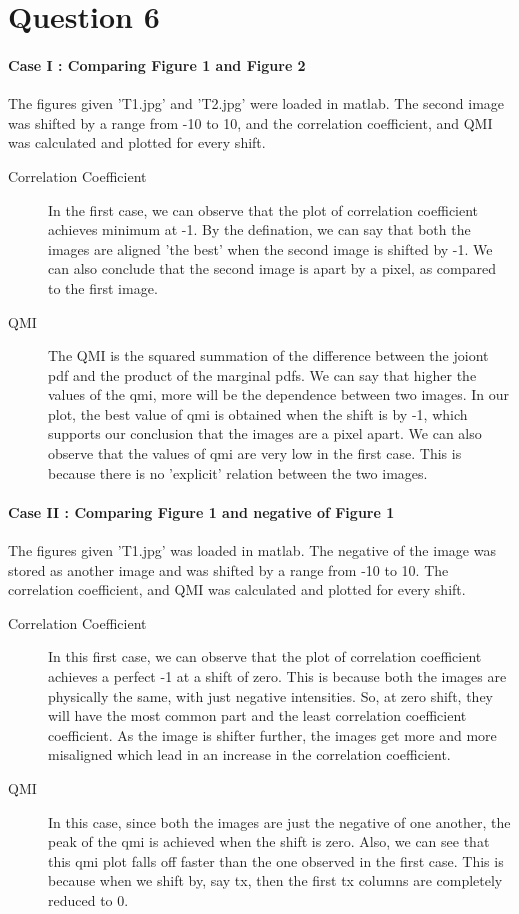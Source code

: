 \documentclass[12pt]{article}
\begin{document}
\newpage
\section{Question 6}
\paragraph{Case I : Comparing Figure 1 and Figure 2\newline}
The figures given 'T1.jpg' and 'T2.jpg' were loaded in matlab. The second image was shifted by a range from -10 to 10, and the correlation coefficient, and QMI was calculated and plotted for every shift.
\begin{description}
\item[Correlation Coefficient] In the first case, we can observe that the plot of correlation coefficient achieves minimum at -1. By the defination, we can say that both the images are aligned 'the best' when the second image is shifted by -1. We can also conclude that the second image is apart by a pixel, as compared to the first image.
\item[QMI] The QMI is the squared summation of the difference between the joiont pdf and the product of the marginal pdfs. We can say that higher the values of the qmi, more will be the dependence between two images. In our plot, the best value of qmi is obtained when the shift is by -1, which supports our conclusion that the images are a pixel apart. We can also observe that the values of qmi are very low in the first case. This is because there is no 'explicit' relation between the two images.
\newline
\end{description}

\paragraph{Case II : Comparing Figure 1 and negative of Figure 1\newline}
The figures given 'T1.jpg' was loaded in matlab. The negative of the image was stored as another image and was shifted by a range from -10 to 10. The correlation coefficient, and QMI was calculated and plotted for every shift.
\begin{description}
\item[Correlation Coefficient] In this first case, we can observe that the plot of correlation coefficient achieves a perfect -1 at a shift of zero. This is because both the images are physically the same, with just negative intensities. So, at zero shift, they will have the most common part and the least correlation coefficient coefficient. As the image is shifter further, the images get more and more misaligned which lead in an increase in the correlation coefficient.
\item[QMI] In this case, since both the images are just the negative of one another, the peak of the qmi is achieved when the shift is zero. Also, we can see that this qmi plot falls off faster than the one observed in the first case. This is because when we shift by, say tx, then the first tx columns are completely reduced to 0. 
\end{description}
\end{document}
